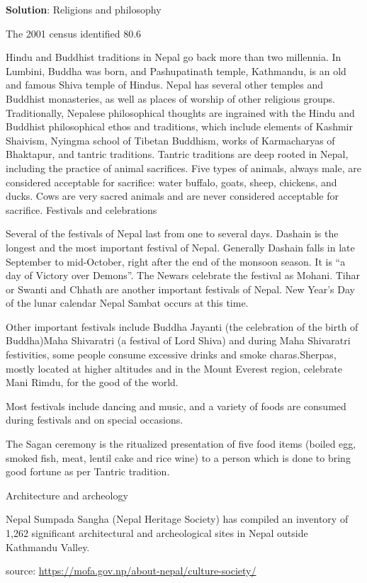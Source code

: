 \documentclass[
  openany]{book}
\newenvironment{solution}{ {\bfseries Solution}:}{}
\begin{document}
\begin{questions}
\begin{solution}
Religions and philosophy

The 2001 census identified 80.6%

Hindu and Buddhist traditions in Nepal go back more than two millennia. In Lumbini, Buddha was born, and Pashupatinath temple, Kathmandu, is an old and famous Shiva temple of Hindus. Nepal has several other temples and Buddhist monasteries, as well as places of worship of other religious groups. Traditionally, Nepalese philosophical thoughts are ingrained with the Hindu and Buddhist philosophical ethos and traditions, which include elements of Kashmir Shaivism, Nyingma school of Tibetan Buddhism, works of Karmacharyas of Bhaktapur, and tantric traditions. Tantric traditions are deep rooted in Nepal, including the practice of animal sacrifices. Five types of animals, always male, are considered acceptable for sacrifice: water buffalo, goats, sheep, chickens, and ducks. Cows are very sacred animals and are never considered acceptable for sacrifice.
Festivals and celebrations

Several of the festivals of Nepal last from one to several days. Dashain is the longest and the most important festival of Nepal. Generally Dashain falls in late September to mid-October, right after the end of the monsoon season. It is “a day of Victory over Demons”. The Newars celebrate the festival as Mohani. Tihar or Swanti and Chhath are another important festivals of Nepal. New Year’s Day of the lunar calendar Nepal Sambat occurs at this time.

Other important festivals include Buddha Jayanti (the celebration of the birth of Buddha)Maha Shivaratri (a festival of Lord Shiva) and during Maha Shivaratri festivities, some people consume excessive drinks and smoke charas.Sherpas, mostly located at higher altitudes and in the Mount Everest region, celebrate Mani Rimdu, for the good of the world.

Most festivals include dancing and music, and a variety of foods are consumed during festivals and on special occasions.

The Sagan ceremony is the ritualized presentation of five food items (boiled egg, smoked fish, meat, lentil cake and rice wine) to a person which is done to bring good fortune as per Tantric tradition.

Architecture and archeology

Nepal Sumpada Sangha (Nepal Heritage Society) has compiled an inventory of 1,262 significant architectural and archeological sites in Nepal outside Kathmandu Valley.

source: \url{https://mofa.gov.np/about-nepal/culture-society/}

\end{solution}

\end{questions}
\end{document}
